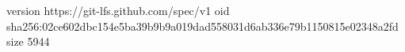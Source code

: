 version https://git-lfs.github.com/spec/v1
oid sha256:02ce602dbc154e5ba39b9b9a019dad558031d6ab336e79b1150815e02348a2fd
size 5944
